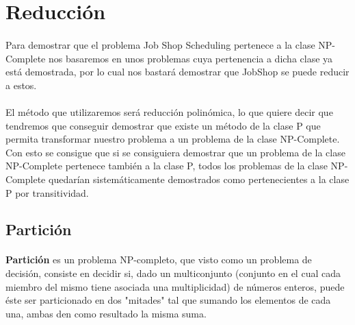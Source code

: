 \documentclass[11pt, a4paper,spanish]{article}
\begin{document}
		\section{Reducción}
		
			\paragraph{}
			Para demostrar que el problema Job Shop Scheduling pertenece a la clase NP-Complete nos basaremos en unos problemas cuya pertenencia a dicha clase ya está demostrada, por lo cual nos bastará demostrar que JobShop se puede reducir a estos. 
			
			\paragraph{}
			El método que utilizaremos será reducción polinómica, lo que quiere decir que tendremos que conseguir demostrar que existe un método de la clase P que permita transformar nuestro problema a un problema de la clase NP-Complete. Con esto se consigue que si se consiguiera demostrar que un problema de la clase NP-Complete pertenece también a la clase P, todos los problemas de la clase NP-Complete quedarían sistemáticamente demostrados como pertenecientes a la clase P por transitividad.
			
			
			\subsection{Partición}

				\paragraph{}
				{\bf Partición} es un problema NP-completo, que visto como un problema de decisión, consiste en decidir si, dado un multiconjunto (conjunto en el cual cada miembro del mismo tiene asociada una multiplicidad) de números enteros, puede éste ser particionado en dos "mitades" tal que sumando los elementos de cada una, ambas den como resultado la misma suma.
			
\end{document}
